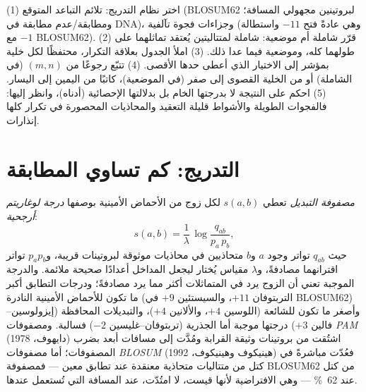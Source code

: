 \begin{method}\label{met:b3:bioinformatics:align}
(1) اختر نظام التدريج:  تلائم التباعد المتوقع
(BLOSUM62 لبروتينين مجهولي المسافة؛ ومطابقة/عدم مطابقة
في DNA)، وجزاءات فجوة تآلفية (وهي عادةً فتح $-11$ واستطالة $-1$
مع BLOSUM62). (2) قرّر شاملة أم موضعية: شاملة لمتتاليتين
يُعتقد تماثلهما على طولهما كله، وموضعية فيما عدا ذلك.
(3) املأ الجدول بعلاقة التكرار، محتفظًا لكل خلية بمؤشر
إلى الاختيار الذي أعطى حدها الأقصى. (4) تتبّع رجوعًا من $(m,n)$
(في الشاملة) أو من الخلية القصوى إلى صفر (في الموضعية)، كاتبًا
 من اليمين إلى اليسار. (5) احكم على النتيجة لا بدرجتها
الخام بل بدلالتها الإحصائية (أدناه)، وانظر إليها:
فالفجوات الطويلة والأشواط قليلة التعقيد والمحاذيات المحصورة في تكرار
كلها إنذارات.
\end{method}

\section{التدريج: كم تساوي المطابقة}

\begin{definition}\label{def:b3:bioinformatics:matrices}
\emph{مصفوفة التبديل} تعطي $s(a,b)$ لكل زوج من الأحماض
الأمينية بوصفها \emph{درجة لوغاريتم أرجحية}:
\[
s(a,b) = \frac{1}{\lambda}\,\log\frac{q_{ab}}{p_{a}\,p_{b}},
\]
حيث $q_{ab}$ تواتر وجود $a$ و$b$ متحاذيين
في محاذيات موثوقة لبروتينات قريبة، و$p_{a} p_{b}$
تواتر اقترانهما مصادفةً، و$\lambda$ مقياس
يُختار ليجعل المداخل أعدادًا صحيحة ملائمة. والدرجة الموجبة
تعني أن الزوج يرد في المتماثلات أكثر مما يرد مصادفةً؛ ودرجات
التطابق أكبر ما تكون للأحماض الأمينية النادرة (التربتوفان $+11$،
والسيستئين $+9$ في BLOSUM62) وأصغر ما تكون للشائعة (اللوسين $+4$،
والألانين $+4$)، والتبديلات المحافظة (إيزولوسين--فالين $+3$)
درجتها موجبة أما الجذرية (تربتوفان--غليسين $-2$) فسالبة.
ومصفوفات \emph{PAM} (دايهوف، 1978) اشتُقت من
بروتينات وثيقة القرابة ومُدَّت إلى مسافات أبعد بضرب
المصفوفات؛ أما مصفوفات \emph{BLOSUM} (هينيكوف
وهينيكوف، 1992) فعُدّت مباشرةً في كتل من متتاليات متحاذية
معنقدة عند تطابق معين --- فمصفوفة BLOSUM62 من كتل عند \qty{62}{\%}
--- وهي الافتراضية لأنها قيست، لا امتُدّت،
عند المسافة التي تُستعمل عندها.
\end{definition}

